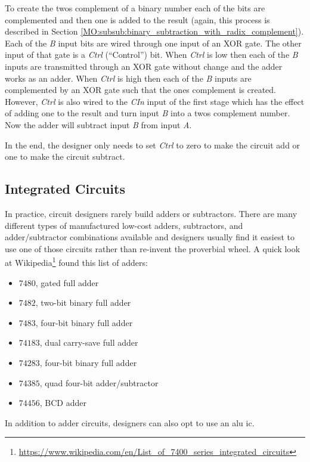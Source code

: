 To create the twos complement of a binary number each of the bits are complemented and then one is added to the result (again, this process is described in Section \ref{MO:subsub:binary_subtraction_with_radix_complement}). Each of the \emph{B} input bits are wired through one input of an \textsf{XOR} gate. The other input of that gate is a \emph{Ctrl} (``Control'') bit. When \emph{Ctrl} is low then each of the \emph{B} inputs are transmitted through an \textsf{XOR} gate without change and the adder works as an adder. When \emph{Ctrl} is high then each of the \emph{B} inputs are complemented by an \textsf{XOR} gate such that the ones complement is created. However, \emph{Ctrl} is also wired to the \emph{CIn} input of the first stage which has the effect of adding one to the result and turn input \emph{B} into a twos complement number. Now the adder will subtract input \emph{B} from input \emph{A}.

In the end, the designer only needs to set \emph{Ctrl} to zero to make the circuit add or one to make the circuit subtract.

\subsection{Integrated Circuits}
\label{CL:subsec:adder_integrated_circuits}

In practice, circuit designers rarely build adders or subtractors. There are many different types of manufactured low-cost adders, subtractors, and adder/subtractor combinations available and designers usually find it easiest to use one of those circuits rather than re-invent the proverbial wheel. A quick look at Wikipedia\footnote{\url{https://www.wikipedia.com/en/List_of_7400_series_integrated_circuits}} found this list of adders:

\begin{itemize}
	\item $ 7480 $, gated full adder
	\item $ 7482 $, two-bit binary full adder
	\item $ 7483 $, four-bit binary full adder
	\item $ 74183 $, dual carry-save full adder
	\item $ 74283 $, four-bit binary full adder
	\item $ 74385 $, quad four-bit adder/subtractor
	\item $ 74456 $, BCD adder
\end{itemize}

In addition to adder circuits, designers can also opt to use an \gls{alu} \gls{ic}.

